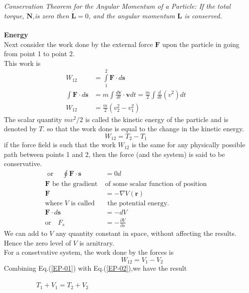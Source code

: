 \textit{Conservation Theorem for the Angular Momentum of a Particle: If the total torque, $\textbf{N}$,is zero then $\dot{\textbf{L}}=0$, and the angular momentum $\textbf{L}$ is conserved. }\\\\
\textbf{Energy}\\
Next consider the work done by the external force $\textbf{F}$ upon the particle in going from point 1 to point 2. \\
This work is 
\begin{align*}
W_{12}&=\int\limits_{1}^{2}\textbf{F}\cdot d\textbf{s}\\
\int\textbf{F}\cdot d\textbf{s}&=m\int\frac{d\textbf{v}}{dt}\cdot\textbf{v}dt=\frac{m}{2}\int\frac{d}{dt}(v^2)dt\\
W_{12}&=\frac{m}{2}(v_2^2-v_1^2)
\end{align*}
The scalar quantity $mv^2/2$ is called the kinetic energy of the particle and is denoted by $T$. so that the work done is equal to the change in the kinetic energy.
\begin{equation}
W_{12} =T_2-T_1\label{EP-01}
\end{equation}
if the force field is such that the work $W_{12}$ is the same for any physically possible path between points 1 and 2, then the force (and the system) is said to be conservative.
\begin{align*}
\text{ or }\quad
\oint\textbf{F}\cdot\textbf{s}&=0 d\\
\text{$\textbf{F}$ be the gradient }&\text{of some scalar function of position}\\
\textbf{F}&=-\nabla V(\textbf{r})\\
\text{where $V$ is called}&\text{ the potential energy.}\\
\textbf{F}\cdot d\textbf{s}&=-dV\\
\text{or}\quad
F_s&=-\frac{\partial V}{\partial s}
\end{align*}
We can add to $V$ any quantity constant in space, without affecting  the results. Hence the zero level of $V$ is arnitrary.\\
For a consetvative system, the work done by the forces is 
\begin{equation}
\hspace{2cm}W_{12}=V_1-V_2\label{EP-02}
\end{equation}
Combining Eq.(\ref{EP-01}) with Eq.(\ref{EP-02}),we have the result \\\\
$\hspace{2cm}T_1+V_1=T_2+V_2$
